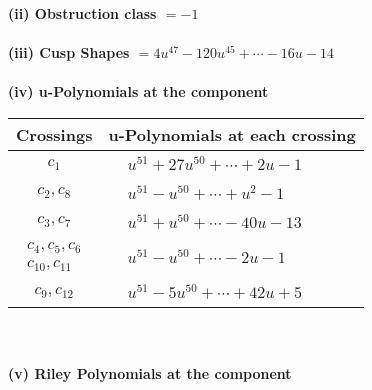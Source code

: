 \documentclass[1p]{elsarticle_modified}
\theoremstyle{definition}
\begin{document}
\flushleft \textbf{(ii) Obstruction class $= -1$}\\~\\
\flushleft \textbf{(iii) Cusp Shapes $= 4 u^{47}-120 u^{45}+\cdots-16 u-14$}\\~\\
\newpage\renewcommand{\arraystretch}{1}
\flushleft \textbf{(iv) u-Polynomials at the component}\newline \\
\begin{tabular}{m{50pt}|m{274pt}}
Crossings & \hspace{64pt}u-Polynomials at each crossing \\
\hline $$\begin{aligned}c_{1}\end{aligned}$$&$\begin{aligned}
&u^{51}+27 u^{50}+\cdots+2 u-1
\end{aligned}$\\
\hline $$\begin{aligned}c_{2},c_{8}\end{aligned}$$&$\begin{aligned}
&u^{51}- u^{50}+\cdots+u^2-1
\end{aligned}$\\
\hline $$\begin{aligned}c_{3},c_{7}\end{aligned}$$&$\begin{aligned}
&u^{51}+u^{50}+\cdots-40 u-13
\end{aligned}$\\
\hline $$\begin{aligned}c_{4},c_{5},c_{6}\\c_{10},c_{11}\end{aligned}$$&$\begin{aligned}
&u^{51}- u^{50}+\cdots-2 u-1
\end{aligned}$\\
\hline $$\begin{aligned}c_{9},c_{12}\end{aligned}$$&$\begin{aligned}
&u^{51}-5 u^{50}+\cdots+42 u+5
\end{aligned}$\\
\hline
\end{tabular}\\~\\
\newpage\renewcommand{\arraystretch}{1}
\flushleft \textbf{(v) Riley Polynomials at the component}\newline \\
\end{document}
